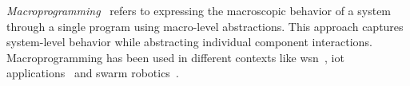 \documentclass[12pt, a4paper]{article}
\begin{document}
\emph{Macroprogramming}~\cite{casadei2023} refers
to expressing the macroscopic behavior of a system through a single program using
macro-level abstractions.
%
This approach captures system-level behavior while abstracting individual component interactions.
%
Macroprogramming has been used in different contexts like \ac{wsn}~\cite{1440891}, \ac{iot} applications~\cite{noor19,mizzi18} and swarm robotics~\cite{buzz}.

%

%
%
%
%
%
%
\sloppypar
\end{document}
